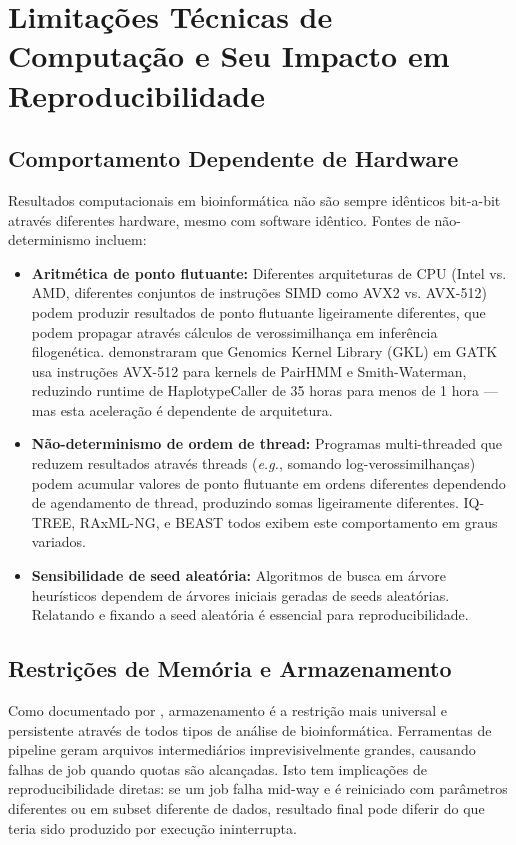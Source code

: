 \section{Limitações Técnicas de Computação e Seu Impacto em Reproducibilidade}

\subsection{Comportamento Dependente de Hardware}

Resultados computacionais em bioinformática não são sempre idênticos bit-a-bit através diferentes hardware, mesmo com software idêntico. Fontes de não-determinismo incluem:

\begin{itemize}
\item \textbf{Aritmética de ponto flutuante:} Diferentes arquiteturas de CPU (Intel vs. AMD, diferentes conjuntos de instruções SIMD como AVX2 vs. AVX-512) podem produzir resultados de ponto flutuante ligeiramente diferentes, que podem propagar através cálculos de verossimilhança em inferência filogenética. \textcite{powers2022} demonstraram que Genomics Kernel Library (GKL) em GATK usa instruções AVX-512 para kernels de PairHMM e Smith-Waterman, reduzindo runtime de HaplotypeCaller de 35 horas para menos de 1 hora --- mas esta aceleração é dependente de arquitetura.

\item \textbf{Não-determinismo de ordem de thread:} Programas multi-threaded que reduzem resultados através threads (\textit{e.g.}, somando log-verossimilhanças) podem acumular valores de ponto flutuante em ordens diferentes dependendo de agendamento de thread, produzindo somas ligeiramente diferentes. IQ-TREE, RAxML-NG, e BEAST todos exibem este comportamento em graus variados.

\item \textbf{Sensibilidade de seed aleatória:} Algoritmos de busca em árvore heurísticos dependem de árvores iniciais geradas de seeds aleatórias. Relatando e fixando a seed aleatória é essencial para reproducibilidade.
\end{itemize}

\subsection{Restrições de Memória e Armazenamento}

Como documentado por \textcite{zafeiropoulos2021}, armazenamento é a restrição mais universal e persistente através de todos tipos de análise de bioinformática. Ferramentas de pipeline geram arquivos intermediários imprevisivelmente grandes, causando falhas de job quando quotas são alcançadas. Isto tem implicações de reproducibilidade diretas: se um job falha mid-way e é reiniciado com parâmetros diferentes ou em subset diferente de dados, resultado final pode diferir do que teria sido produzido por execução ininterrupta.

